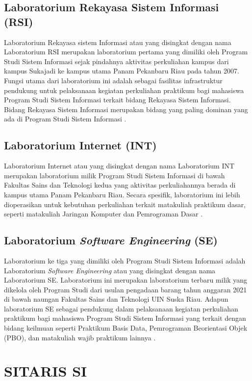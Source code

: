 \subsection{Laboratorium Rekayasa Sistem Informasi (RSI)}
Laboratorium Rekayasa sistem Informasi atau yang disingkat dengan nama Laboratorium RSI merupakan laboratorium pertama yang dimiliki oleh Program Studi Sistem Informasi sejak pindahnya aktivitas perkuliahan kampus dari kampus Sukajadi ke kampus utama Panam Pekanbaru Riau pada tahun 2007. Fungsi utama dari laboratorium ini adalah sebagai fasilitas infrastruktur pendukung untuk pelaksanaan kegiatan perkuliahan praktikum bagi mahasiswa Program Studi Sistem Informasi terkait bidang Rekayasa Sistem Informasi. Bidang Rekayasa Sistem Informasi merupakan bidang yang paling dominan yang ada di Program Studi Sistem Informasi \cite{lab-si-website}.

\subsection{Laboratorium Internet (INT)}
Laboratorium Internet atau yang disingkat dengan nama Laboratorium INT merupakan laboratorium milik Program Studi Sistem Informasi di bawah Fakultas Sains dan Teknologi kedua yang aktivitas perkuliahannya berada di kampus utama Panam Pekanbaru Riau. Secara spesifik, laboratorium ini lebih dioperasikan untuk kebutuhan perkuliahan terkait matakuliah praktikum dasar, seperti matakuliah Jaringan Komputer dan Pemrograman Dasar \cite{lab-si-website}.

\subsection{Laboratorium \textit{Software Engineering} (SE)}
Laboratorium ke tiga yang dimiliki oleh Program Studi Sistem Informasi adalah Laboratorium \textit{Software Engineering} atau yang disingkat dengan nama Laboratorium SE. Laboratorium ini merupakan laboratorium terbaru milik yang dikelola oleh Program Studi dari usulan pengadaan barang tahun anggaran 2021 di bawah naungan Fakultas Sains dan Teknologi UIN Suska Riau. Adapun laboratorium SE sebagai pendukung dalam pelaksanaan kegiatan perkuliahan praktikum bagi mahasiswa Program Studi Sistem Informasi yang terkait dengan bidang keilmuan seperti Praktikum Basis Data, Pemrograman Beorientasi Objek (PBO), dan matakuliah wajib praktikum lainnya \cite{lab-si-website}.

\section{SITARIS SI}


